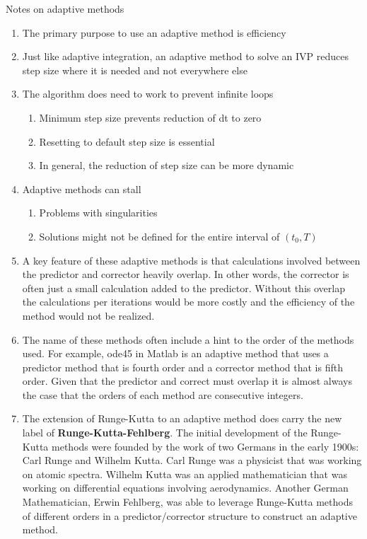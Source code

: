 \documentclass[twoside]{article}
\begin{document}
Notes on adaptive methods
\begin{enumerate}
    \item The primary purpose to use an adaptive method is efficiency
    \item Just like adaptive integration, an adaptive method to solve an IVP reduces step size where it is needed and not everywhere else
    \item The algorithm does need to work to prevent infinite loops
    \begin{enumerate}
        \item Minimum step size prevents reduction of dt to zero
        \item Resetting to default step size is essential
        \item In general, the reduction of step size can be more dynamic
    \end{enumerate}
    \item Adaptive methods can stall
    \begin{enumerate}
        \item Problems with singularities
        \item Solutions might not be defined for the entire interval of $(t_0,T)$
    \end{enumerate}
    \item A key feature of these adaptive methods is that calculations involved between the predictor and corrector heavily overlap. In other words, the corrector is often just a small calculation added to the predictor. Without this overlap the calculations per iterations would be more costly and the efficiency of the method would not be realized. 
    \item The name of these methods often include a hint to the order of the methods used. For example, ode45 in Matlab is an adaptive method that uses a predictor method that is fourth order and a corrector method that is fifth order. Given that the predictor and correct must overlap it is almost always the case that the orders of each method are consecutive integers. 
  \item The extension of Runge-Kutta to an adaptive method does carry the new label of {\bf Runge-Kutta-Fehlberg}. The initial development of the Runge-Kutta methods were founded by the work of two Germans in the early 1900s: Carl Runge and Wilhelm Kutta. Carl Runge was a physicist that was working on atomic spectra. Wilhelm Kutta was an applied mathematician that was working on differential equations involving aerodynamics. Another German Mathematician, Erwin Fehlberg, was able to leverage Runge-Kutta methods of different orders in a predictor/corrector structure to construct an adaptive method. 
\end{enumerate}
\end{document}

